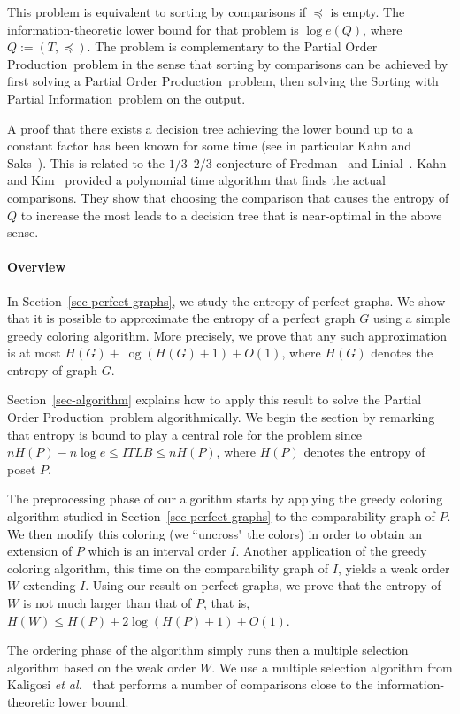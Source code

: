 \documentclass[12pt,oneside]{article}
\newcommand{\partsort}{{\sc Partial Order Production}}
\newcommand{\sortwpi}{{\sc Sorting with Partial Information}}
\begin{document}
This problem is equivalent to sorting by comparisons if $\preccurlyeq$ is empty. The information-theoretic lower bound for that problem is $\log e(Q)$, where $Q := (T,\preccurlyeq)$. The problem is complementary to the \partsort\ problem in the sense that sorting by comparisons can be achieved by first solving a \partsort\ problem, then solving the \sortwpi\ problem on the output.

A proof that there exists a decision tree achieving the lower bound up to a constant factor has been known for some time (see in particular Kahn and Saks~\cite{KS84j}). This is related to the $1/3$--$2/3$ conjecture of Fredman~\cite{F76} and Linial~\cite{L84}. Kahn and Kim~\cite{KK95} provided a polynomial time algorithm that finds the actual comparisons. They show that choosing the comparison that causes the entropy of $Q$ to increase the most leads to a decision tree that is near-optimal in the above sense.

\paragraph{Overview}
In Section~\ref{sec-perfect-graphs}, we study the entropy of perfect graphs. We show that it is possible to approximate the entropy of a perfect graph $G$ using a simple greedy coloring algorithm. More precisely, we prove that any such approximation is at most $H(G) + \log (H(G)+1) + O(1)$, where $H(G)$ denotes the entropy of graph $G$.\smallskip

Section~\ref{sec-algorithm} explains how to apply this result to solve the \partsort\ problem algorithmically. We begin the section by remarking that entropy is bound to play a central role for the problem since $nH(P) - n \log e \leq ITLB \leq nH(P)$, where $H(P)$ denotes the entropy of poset $P$.

The preprocessing phase of our algorithm starts by applying the greedy coloring algorithm studied in Section~\ref{sec-perfect-graphs} to the comparability graph of $P$.  We then modify this coloring (we ``uncross" the colors) in order to obtain an extension of $P$ which is an interval order $I$. Another application of the greedy coloring algorithm, this time on the comparability graph of $I$, yields a weak order $W$ extending $I$. Using our result on perfect graphs, we prove that the entropy of $W$ is not much larger than that of $P$, that is, $H(W) \le H(P) + 2\log (H(P)+1) + O(1)$.

The ordering phase of the algorithm simply runs then a multiple selection algorithm based on the weak order $W$. We use a multiple selection algorithm from Kaligosi {\it et al.}~\cite{KMMS05} that performs a number of comparisons close to the information-theoretic lower bound.
\end{document}
